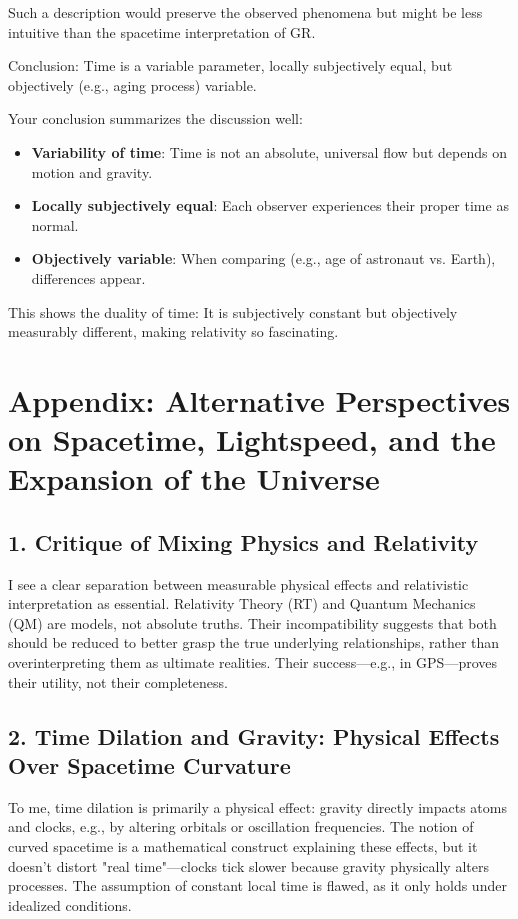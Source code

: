 \documentclass[a4paper,12pt]{article}
\begin{document}
	Such a description would preserve the observed phenomena but might be less intuitive than the spacetime interpretation of GR.
	
	Conclusion: Time is a variable parameter, locally subjectively equal, but objectively (e.g., aging process) variable.
	
	Your conclusion summarizes the discussion well:
	\begin{itemize}
		\item \textbf{Variability of time}: Time is not an absolute, universal flow but depends on motion and gravity.
		\item \textbf{Locally subjectively equal}: Each observer experiences their proper time as normal.
		\item \textbf{Objectively variable}: When comparing (e.g., age of astronaut vs. Earth), differences appear.
	\end{itemize}
	
	This shows the duality of time: It is subjectively constant but objectively measurably different, making relativity so fascinating.

		
		\section{Appendix: Alternative Perspectives on Spacetime, Lightspeed, and the Expansion of the Universe}
		
		\subsection{1. Critique of Mixing Physics and Relativity}
		I see a clear separation between measurable physical effects and relativistic interpretation as essential. Relativity Theory (RT) and Quantum Mechanics (QM) are models, not absolute truths. Their incompatibility suggests that both should be reduced to better grasp the true underlying relationships, rather than overinterpreting them as ultimate realities. Their success—e.g., in GPS—proves their utility, not their completeness.
		
		\subsection{2. Time Dilation and Gravity: Physical Effects Over Spacetime Curvature}
		To me, time dilation is primarily a physical effect: gravity directly impacts atoms and clocks, e.g., by altering orbitals or oscillation frequencies. The notion of curved spacetime is a mathematical construct explaining these effects, but it doesn’t distort "real time"—clocks tick slower because gravity physically alters processes. The assumption of constant local time is flawed, as it only holds under idealized conditions.
		
\end{document}
